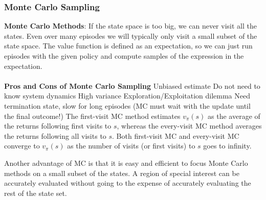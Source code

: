 \documentclass[12pt]{article}
\begin{document}
\subsubsection{Monte Carlo Sampling}
\textbf{Monte Carlo Methods}: If the state space is too big, we can never visit all the states. Even over many episodes we will typically only visit a small subset of the state space. The value function is defined as an expectation, so we can just run episodes with the given policy and compute samples of the expression in the expectation.
\\\\
\textbf{Pros and Cons of Monte Carlo Sampling}
\ulb
\pro Unbiased estimate
\pro Do not need to know system dynamics
\con High variance
\con Exploration/Exploitation dilemma
\con Need termination state, slow for long episodes (MC must wait with the update until the final outcome!)
\ule
The first-visit MC method estimates $v_{\pi}(s)$ as the average of the returns following first visits to $s$, whereas the every-visit MC method averages the returns following all visits to $s$. Both first-visit MC and every-visit MC converge to $v_{\pi}(s)$ as the number of visits (or first visits) to $s$ goes to infinity. 
\par Another advantage of MC is that it is easy and efficient to focus Monte Carlo methods on a small subset of the states. A region of special interest can be accurately evaluated without going to the expense of accurately evaluating the rest of the state set.
\end{document}
